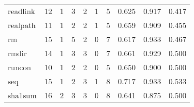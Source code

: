 \begin{longtable}{lp{2.0cm}p{2.0cm}p{2.0cm}p{2.0cm}p{2.0cm}p{2.0cm}p{2.0cm}p{2.0cm}p{2.0cm}}
readlink  &                     12 &                                             1 &                                            3 &                                           2 &                                            1 &                                          5 &                                0.625 &                                  0.917 &                                0.417 \\
realpath  &                     11 &                                             1 &                                            2 &                                           2 &                                            1 &                                          5 &                                0.659 &                                  0.909 &                                0.455 \\
rm        &                     15 &                                             1 &                                            5 &                                           2 &                                            0 &                                          7 &                                0.617 &                                  0.933 &                                0.467 \\
rmdir     &                     14 &                                             1 &                                            3 &                                           3 &                                            0 &                                          7 &                                0.661 &                                  0.929 &                                0.500 \\
runcon    &                     10 &                                             1 &                                            2 &                                           2 &                                            0 &                                          5 &                                0.650 &                                  0.900 &                                0.500 \\
seq       &                     15 &                                             1 &                                            2 &                                           3 &                                            1 &                                          8 &                                0.717 &                                  0.933 &                                0.533 \\
sha1sum   &                     16 &                                             2 &                                            3 &                                           3 &                                            0 &                                          8 &                                0.641 &                                  0.875 &                                0.500 \\

\end{longtable}
